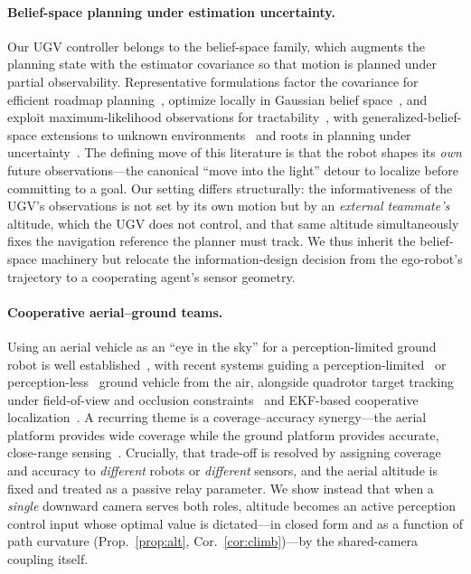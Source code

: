 \paragraph*{Belief-space planning under estimation uncertainty.}
Our UGV controller belongs to the belief-space family, which augments the planning
state with the estimator covariance so that motion is planned under partial
observability. Representative formulations factor the covariance for efficient
roadmap planning~\cite{prentice2009belief}, optimize locally in Gaussian belief
space~\cite{vandenberg2012motion}, and exploit maximum-likelihood observations for
tractability~\cite{platt2010belief}, with generalized-belief-space extensions to
unknown environments~\cite{indelman2015planning} and roots in planning under
uncertainty~\cite{kaelbling1998planning}. The defining move of this literature is that
the robot shapes its \emph{own} future observations---the canonical ``move into the
light'' detour to localize before committing to a goal. Our setting differs
structurally: the informativeness of the UGV's observations is not set by its own
motion but by an \emph{external teammate's} altitude, which the UGV does not control,
and that same altitude simultaneously fixes the navigation reference the planner must
track. We thus inherit the belief-space machinery but relocate the information-design
decision from the ego-robot's trajectory to a cooperating agent's sensor geometry.

\paragraph*{Cooperative aerial--ground teams.}
Using an aerial vehicle as an ``eye in the sky'' for a perception-limited ground robot
is well established~\cite{grocholsky2006cooperative}, with recent systems guiding a
perception-limited~\cite{li2024colag} or perception-less~\cite{santos2024aerial} ground
vehicle from the air, alongside quadrotor target tracking under field-of-view and
occlusion constraints~\cite{thomas2017autonomous,penin2018vision} and EKF-based
cooperative localization~\cite{roumeliotis2002distributed,kia2016cooperative}. A
recurring theme is a coverage--accuracy synergy---the aerial platform provides wide
coverage while the ground platform provides accurate, close-range
sensing~\cite{grocholsky2006cooperative}. Crucially, that trade-off is resolved by
assigning coverage and accuracy to \emph{different} robots or \emph{different} sensors,
and the aerial altitude is fixed and treated as a passive relay parameter. We show
instead that when a \emph{single} downward camera serves both roles, altitude becomes
an active perception control input whose optimal value is dictated---in closed form and
as a function of path curvature (Prop.~\ref{prop:alt}, Cor.~\ref{cor:climb})---by the
shared-camera coupling itself.

